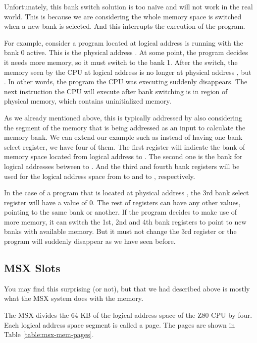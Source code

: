 Unfortunately, this bank switch solution is too naïve and will not work in the real world. This is because we are considering the whole memory space is switched when a new bank is selected. And this interrupts the execution of the program. 

For example, consider a program located at logical address  is running with the bank 0 active. This is the physical address . At some point, the program decides it needs more memory, so it must switch to the bank 1. After the switch, the memory seen by the CPU at logical address  is no longer at physical address , but . In other words, the program the CPU was executing suddenly disappears. The next instruction the CPU will execute after bank switching is in  region of physical memory, which contains uninitialized memory. 

As we already mentioned above, this is typically addressed by also considering the segment of the memory that is being addressed as an input to calculate the memory bank. We can extend our example such as instead of having one bank select register, we have four of them. The first register will indicate the bank of memory space located from logical address  to . The second one is the bank for logical addresses between  to . And the third and fourth bank registers will be used for the logical address space from  to  and  to , respectively. 

In the case of a program that is located at physical address , the 3rd bank select register will have a value of 0. The rest of registers can have any other values, pointing to the same bank or another. If the program decides to make use of more memory, it can switch the 1st, 2nd and 4th bank registers to point to new banks with available memory. But it must not change the 3rd register or the program will suddenly disappear as we have seen before. 

\subsection{MSX Slots}

You may find this surprising (or not), but that we had described above is mostly what the MSX system does with the memory.

The MSX divides the 64 KB of the logical address space of the Z80 CPU by four. Each logical address space segment is called a page. The pages are shown in Table \ref{table:msx-mem-pages}.

